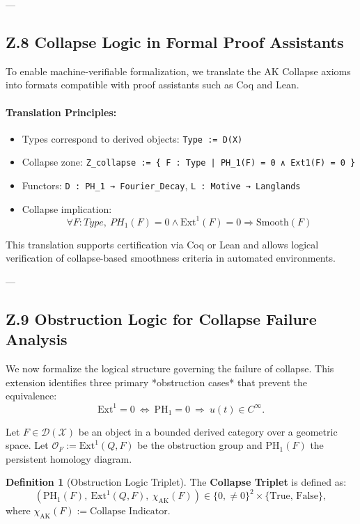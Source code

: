 \documentclass[11pt]{article}
\theoremstyle{definition}
\newtheorem{definition}[theorem]{Definition}
\begin{document}
---

\subsection*{Z.8 Collapse Logic in Formal Proof Assistants}

To enable machine-verifiable formalization, we translate the AK Collapse axioms into formats compatible with proof assistants such as Coq and Lean.

\paragraph{Translation Principles:}
\begin{itemize}
  \item Types correspond to derived objects: \texttt{Type := D(X)}
  \item Collapse zone: \texttt{Z\_collapse := \{ F : Type | PH\_1(F) = 0 ∧ Ext1(F) = 0 \}}
  \item Functors: \texttt{D : PH\_1 → Fourier\_Decay}, \quad \texttt{L : Motive → Langlands}
  \item Collapse implication: 
  \[
  \forall F : Type, \ PH_1(F) = 0 \land \mathrm{Ext}^1(F) = 0 \Rightarrow \mathrm{Smooth}(F)
  \]
\end{itemize}

This translation supports certification via Coq or Lean and allows logical verification of collapse-based smoothness criteria in automated environments.

---

\subsection*{Z.9 Obstruction Logic for Collapse Failure Analysis}

We now formalize the logical structure governing the failure of collapse.  
This extension identifies three primary *obstruction cases* that prevent the equivalence:
\[
\mathrm{Ext}^1 = 0 \ \Longleftrightarrow\ \mathrm{PH}_1 = 0 \ \Longrightarrow\ u(t) \in C^\infty.
\]

\vspace{1em}
Let $F \in \mathcal{D}(\mathcal{X})$ be an object in a bounded derived category over a geometric space.  
Let $\mathcal{O}_F := \mathrm{Ext}^1(Q, F)$ be the obstruction group and $\mathrm{PH}_1(F)$ the persistent homology diagram.

\begin{definition}[Obstruction Logic Triplet]
The \textbf{Collapse Triplet} is defined as:
\[
\left( \mathrm{PH}_1(F),\ \mathrm{Ext}^1(Q,F),\ \chi_{\text{AK}}(F) \right)
\in \{0, \neq 0\}^2 \times \{\text{True, False}\},
\]
where $\chi_{\text{AK}}(F) := \text{Collapse Indicator}$.
\end{definition}
\end{document}
